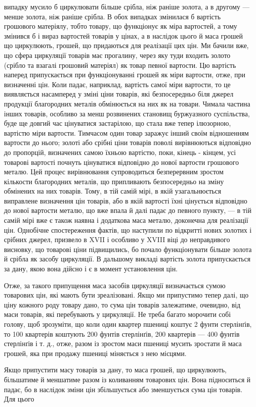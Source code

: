 \parcont{}  %
випадку мусило б циркулювати більше срібла, ніж раніше золота,
а в другому — менше золота, ніж раніше срібла. В обох випадках
змінилася б вартість грошового матеріялу, тобто товару,
що функціонує як міра вартостей, а тому змінився б і вираз
вартостей товарів у цінах, а в наслідок цього й маса грошей
що циркулюють, грошей, що придаються для реалізації цих
цін. Ми бачили вже, що сфера циркуляції товарів має прогалину,
через яку туди входить золото (срібло та взагалі грошовий
матеріял) як товар певної вартости. Цю вартість наперед припускається
при функціонуванні грошей як міри вартости, отже,
при визначенні цін. Коли падає, наприклад, вартість самої міри
вартости, то це виявляється насамперед у зміні ціни товарів,
які безпосередньо біля джерел продукції благородних металів
обмінюється на них як на товари. Чимала частина інших товарів,
особливо за менш розвинених становищ буржуазного суспільства,
буде ще довгий час цінуватися застарілою, що стала вже тепер
ілюзорною, вартістю міри вартости. Тимчасом один товар заражує
інший своїм відношенням вартости до нього; золоті або
срібні ціни товарів поволі вирівнюються відповідно до пропорцій,
визначених самою їхньою вартістю, поки, кінець - кінцем, усі
товарові вартості почнуть цінуватися відповідно до нової вартости
грошового металю. Цей процес вирівнювання супроводиться
безперервним зростом кількости благородних металів, що припливають
безпосередньо на зміну обмінених на них товарів.
Тому, в тій самій мірі, в якій узагальнюється виправлене визначення
цін товарів, або в якій вартості їхні цінується відповідно
до нової вартости металю, що вже впала й далі падає до певного
пункту, — в тій самій мірі вже є також наявна і додаткова
маса металю, доконечна для реалізації цін. Однобічне спостереження
фактів, що наступили по відкритті нових золотих і срібних
джерел, призвело в XVII і особливо у XVIII віці до неправдивого
висновку, що товарові ціни підвищились, бо почало функціонувати
більше золота й срібла як засобу циркуляції. В дальшому
викладі вартість золота припускається за дану, якою вона
дійсно і є в момент установлення цін.

Отже, за такого припущення маса засобів циркуляції визначається
сумою товарових цін, які мають бути зреалізовані. Якщо
ми припустимо тепер далі, що ціну кожного роду товару дано,
то сума цін товарів залежатиме, очевидно, від маси товарів,
які перебувають у циркуляції. Не треба багато морочити собі
голову, щоб зрозуміти, що коли один квартер пшениці коштує
2 фунти стерлінґів, то 100 квартерів коштують 200 фунтів стерлінґів,
200 квартерів — 400 фунтів стерлінґів і т. д., отже, разом
із зростом маси пшениці мусить зростати й маса грошей, яка
при продажу пшениці міняється з нею місцями.

Якщо припустити масу товарів за дану, то маса грошей, що
циркулюють, більшатиме й меншатиме разом із коливанням
товарових цін. Вона підноситься й падає, бо в наслідок зміни
цін збільшується або зменшується сума цін товарів. Для цього
\parbreak{}  %
